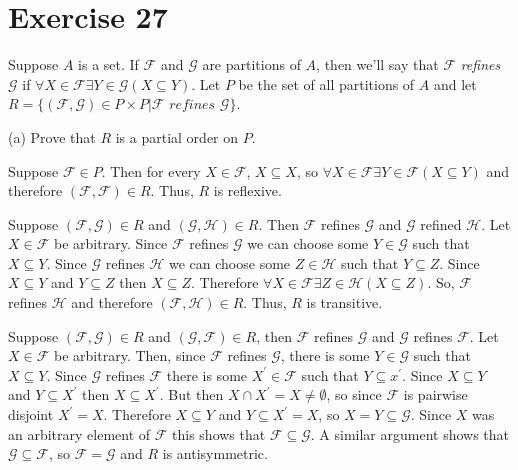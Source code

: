 \documentclass[11pt]{article}
\newcommand{\family}[1]{\mathcal{#1}}
\begin{document}
\section*{Exercise 27}

Suppose $A$ is a set. If $\family{F}$ and $\family{G}$ are partitions of $A$,
then we'll say that $\family{F}$ \textit{refines} $\family{G}$ if 
$\forall X \in \family{F} \exists Y \in \family{G} (X \subseteq Y)$. Let $P$ be 
the set of all partitions of $A$ and let 
$R=\{(\family{F}, \family{G}) \in P \times P | \family{F} \textit{ refines } \family{G}\}$.

\noindent (a) Prove that $R$ is a partial order on $P$.

Suppose $\family{F} \in P$. Then for every $X \in \family{F}$, $X \subseteq X$,
so $\forall X \in \family{F} \exists Y \in \family{F} (X \subseteq Y)$ and therefore 
$(\family{F}, \family{F}) \in R$. Thus, $R$ is reflexive.

Suppose $(\family{F}, \family{G}) \in R$ and $(\family{G}, \family{H}) \in R$.
Then $\family{F}$ refines $\family{G}$ and $\family{G}$ refined $\family{H}$.
Let $X \in \family{F}$ be arbitrary. Since $\family{F}$ refines $\family{G}$
we can choose some $Y \in \family{G}$ such that $X \subseteq Y$. Since $\family{G}$
refines $\family{H}$ we can choose some $Z \in \family{H}$ such that $Y \subseteq Z$.
Since $X \subseteq Y$ and $Y \subseteq Z$ then $X \subseteq Z$. Therefore
$\forall X \in \family{F} \exists Z \in \family{H} (X \subseteq Z)$. So,
$\family{F}$ refines $\family{H}$ and therefore $(\family{F}, \family{H}) \in R$.
Thus, $R$ is transitive.

Suppose $(\family{F}, \family{G}) \in R$ and $(\family{G}, \family{F}) \in R$, 
then $\family{F}$ refines $\family{G}$ and $\family{G}$ refines $\family{F}$.
Let $X \in \family{F}$ be arbitrary. Then, since $\family{F}$ refines $\family{G}$,
there is some $Y \in \family{G}$ such that $X \subseteq Y$. Since $\family{G}$ 
refines $\family{F}$ there is some $X^\prime \in \family{F}$ such that 
$Y \subseteq x^\prime$. Since $X \subseteq Y$ and $Y \subseteq X^\prime$
then $X \subseteq X^\prime$. But then $X \cap X^\prime = X \neq \emptyset$, so 
since $\family{F}$ is pairwise disjoint $X^\prime = X$. Therefore $X \subseteq Y$
and $Y \subseteq X^\prime = X$, so $X = Y \subseteq \family{G}$. Since $X$ was 
an arbitrary element of $\family{F}$ this shows that $\family{F} \subseteq \family{G}$.
A similar argument shows that $\family{G} \subseteq \family{F}$, so 
$\family{F} = \family{G}$ and $R$ is antisymmetric.
\end{document}
